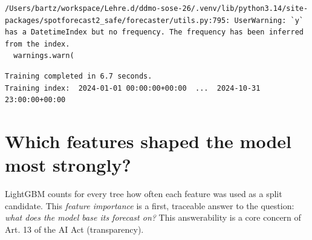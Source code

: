 \documentclass[
  english,
  letterpaper,
]{scrbook}
\begin{document}
\begin{verbatim}
/Users/bartz/workspace/Lehre.d/ddmo-sose-26/.venv/lib/python3.14/site-packages/spotforecast2_safe/forecaster/utils.py:795: UserWarning: `y` has a DatetimeIndex but no frequency. The frequency has been inferred from the index.
  warnings.warn(
\end{verbatim}

\begin{verbatim}
Training completed in 6.7 seconds.
Training index:  2024-01-01 00:00:00+00:00  ...  2024-10-31 23:00:00+00:00
\end{verbatim}

\section{Which features shaped the model most
strongly?}\label{which-features-shaped-the-model-most-strongly}

LightGBM counts for every tree how often each feature was used as a
split candidate. This \emph{feature importance} is a first, traceable
answer to the question: \emph{what does the model base its forecast on?}
This answerability is a core concern of Art. 13 of the AI Act
(transparency).
\end{document}
